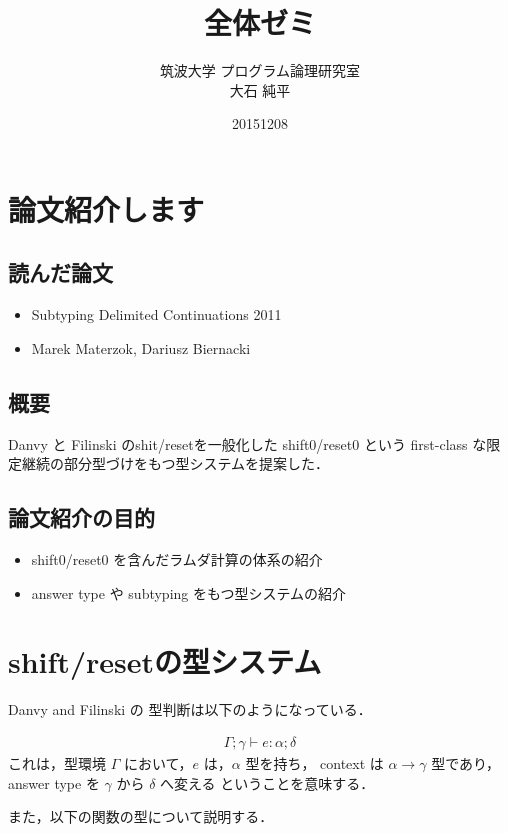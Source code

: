 \documentclass[9pt,a4paper,onecolumn]{jarticle}
\title {\vspace{-3cm}全体ゼミ}
\date{20151208}
\author{筑波大学 プログラム論理研究室 \\ 大石 純平}
\theoremstyle{definition}
\begin{document}
\maketitle


\section{論文紹介します}

\subsection*{読んだ論文}
\begin{itemize}
\item Subtyping Delimited Continuations 2011
\item Marek Materzok, Dariusz Biernacki
\end{itemize}

\subsection*{概要}

Danvy と Filinski のshit/resetを一般化した shift0/reset0 という first-class な限定継続の部分型づけをもつ型システムを提案した．

\subsection*{論文紹介の目的}
\begin{itemize}
\item shift0/reset0 を含んだラムダ計算の体系の紹介
\item answer type や subtyping をもつ型システムの紹介
\end{itemize}

\section{shift/resetの型システム}
Danvy and  Filinski の 型判断は以下のようになっている．

\begin{align}
  \Gamma; \gamma \vdash e : \alpha; \delta
\end{align}
これは，型環境 $\Gamma$ において，$e$ は，$\alpha$ 型を持ち，
context は $\alpha \to \gamma$ 型であり，
answer type を $\gamma$ から $\delta$ へ変える ということを意味する．

また，以下の関数の型について説明する．
\end{document}
